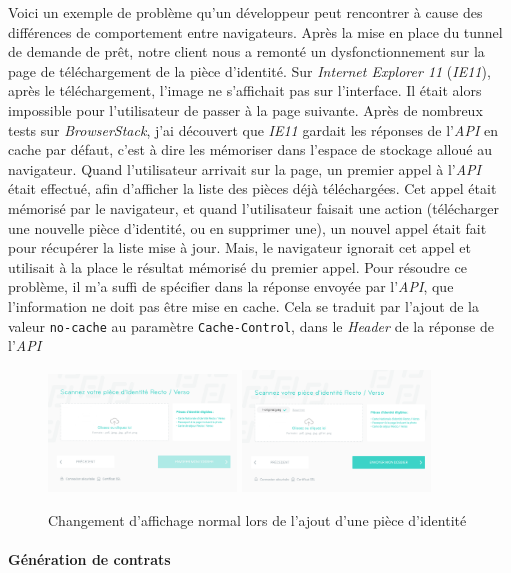 Voici un exemple de problème qu'un développeur peut rencontrer à cause
des différences de comportement entre navigateurs. Après la mise en
place du tunnel de demande de prêt, notre client nous a remonté un
dysfonctionnement sur la page de téléchargement de la pièce d'identité.
Sur \emph{Internet Explorer 11} (\emph{IE11}), après le téléchargement,
l'image ne s'affichait pas sur l'interface. Il était alors impossible
pour l'utilisateur de passer à la page suivante. Après de nombreux tests
sur \emph{BrowserStack}, j'ai découvert que \emph{IE11} gardait les
réponses de l'\emph{API} en cache par défaut, c'est à dire les mémoriser
dans l'espace de stockage alloué au navigateur. Quand l'utilisateur
arrivait sur la page, un premier appel à l'\emph{API} était effectué,
afin d'afficher la liste des pièces déjà téléchargées. Cet appel était
mémorisé par le navigateur, et quand l'utilisateur faisait une action
(télécharger une nouvelle pièce d'identité, ou en supprimer une), un
nouvel appel était fait pour récupérer la liste mise à jour. Mais, le
navigateur ignorait cet appel et utilisait à la place le résultat
mémorisé du premier appel. Pour résoudre ce problème, il m'a suffi de
spécifier dans la réponse envoyée par l'\emph{API}, que l'information ne
doit pas être mise en cache. Cela se traduit par l'ajout de la valeur
\texttt{no-cache} au paramètre \texttt{Cache-Control}, dans le
\emph{Header} de la réponse de l'\emph{API}

\bigskip

\begin{figure}[h]
  \centering
  \includegraphics[width=5cm]{figures/finfrog-1.png}
  \includegraphics[width=5cm]{figures/finfrog-2.png}
  \caption{Changement d'affichage normal lors de l'ajout d'une pièce d'identité}
\end{figure}

\paragraph{Génération de contrats}\label{guxe9nuxe9ration-de-contrats}

